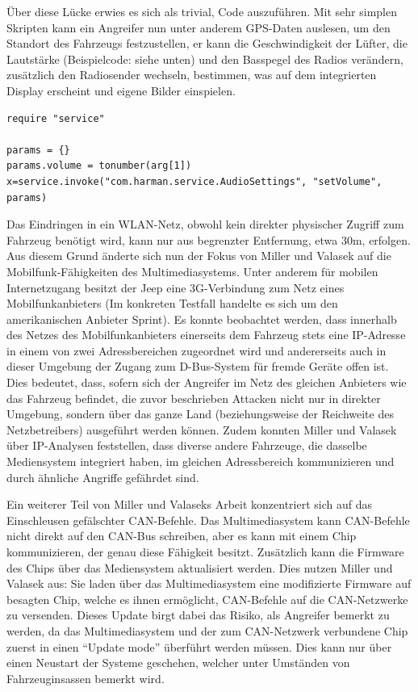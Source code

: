 \documentclass[
    fontsize=12pt,
    headings=small,
    parskip=half,           %
    bibliography=totoc,
    numbers=noenddot,       %
    open=any,               %
    ]{scrreprt}
\begin{document}
Über diese Lücke erwies es sich als trivial, Code auszuführen. Mit sehr simplen Skripten kann ein Angreifer nun unter anderem GPS-Daten auslesen, um den Standort des Fahrzeugs festzustellen, er kann die Geschwindigkeit der Lüfter, die Lautstärke (Beispielcode: siehe unten) und den Basspegel des Radios verändern, zusätzlich den Radiosender wechseln, bestimmen, was auf dem integrierten Display erscheint und eigene Bilder einspielen. \\
\begin{lstlisting}[caption=Beispielskript zum Ändern der Lautstärke.]
require "service"

params = {}
params.volume = tonumber(arg[1])
x=service.invoke("com.harman.service.AudioSettings", "setVolume", params)
\end{lstlisting}

Das Eindringen in ein WLAN-Netz, obwohl kein direkter physischer Zugriff zum Fahrzeug benötigt wird, kann nur aus begrenzter Entfernung, etwa 30m, erfolgen. Aus diesem Grund änderte sich nun der Fokus von Miller und Valasek auf die Mobilfunk-Fähigkeiten des Multimediasystems. Unter anderem für mobilen Internetzugang besitzt der Jeep eine 3G-Verbindung zum Netz eines Mobilfunkanbieters (Im konkreten Testfall handelte es sich um den amerikanischen Anbieter Sprint). Es konnte beobachtet werden, dass innerhalb des Netzes des Mobilfunkanbieters einerseits dem Fahrzeug stets eine IP-Adresse in einem von zwei Adressbereichen zugeordnet wird und andererseits auch in dieser Umgebung der Zugang zum D-Bus-System für fremde Geräte offen ist. Dies bedeutet, dass, sofern sich der Angreifer im Netz des gleichen Anbieters wie das Fahrzeug befindet, die zuvor beschrieben Attacken nicht nur in direkter Umgebung, sondern über das ganze Land (beziehungsweise der Reichweite des Netzbetreibers) ausgeführt werden können. Zudem konnten Miller und Valasek über IP-Analysen feststellen, dass diverse andere Fahrzeuge, die dasselbe Mediensystem integriert haben, im gleichen Adressbereich kommunizieren und durch ähnliche Angriffe gefährdet sind. \par
Ein weiterer Teil von Miller und Valaseks Arbeit konzentriert sich auf das Einschleusen gefälschter CAN-Befehle. Das Multimediasystem kann CAN-Befehle nicht direkt auf den CAN-Bus schreiben, aber es kann mit einem Chip kommunizieren, der genau diese Fähigkeit besitzt. Zusätzlich kann die Firmware des Chips über das Mediensystem aktualisiert werden. Dies nutzen Miller und Valasek aus: Sie laden über das Multimediasystem eine modifizierte Firmware auf besagten Chip, welche es ihnen ermöglicht, CAN-Befehle auf die CAN-Netzwerke zu versenden. Dieses Update birgt dabei das Risiko, als Angreifer bemerkt zu werden, da das Multimediasystem und der zum CAN-Netzwerk verbundene Chip zuerst in einen "`Update mode"' überführt werden müssen. Dies kann nur über einen Neustart der Systeme geschehen, welcher unter Umständen von Fahrzeuginsassen bemerkt wird. \par
\end{document}
